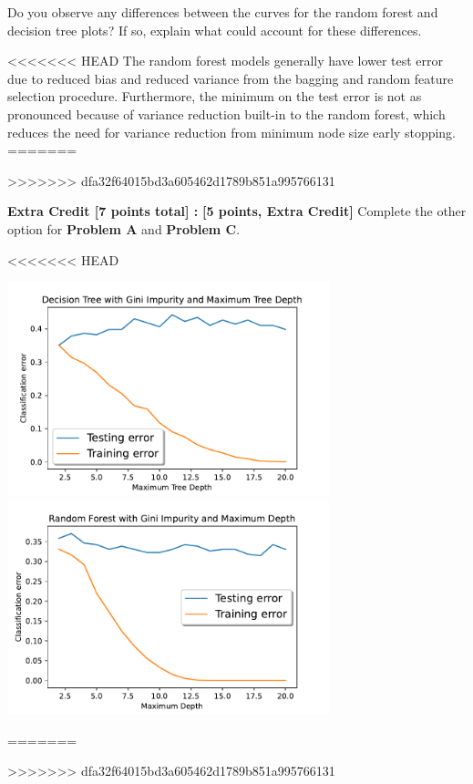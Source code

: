 \problem[4]
Do you observe any differences between the curves for the random forest and decision tree plots? If so, explain what could account for these differences.

\begin{solution}
<<<<<<< HEAD
    The random forest models generally have lower test error due to reduced bias and reduced variance from the bagging and random feature selection procedure. Furthermore, the minimum on the test error is not as pronounced because of variance reduction built-in to the random forest, which reduces the need for variance reduction from minimum node size early stopping.
=======

>>>>>>> dfa32f64015bd3a605462d1789b851a995766131
\end{solution}

\textbf{Extra Credit [7 points total] :} \problem\textbf{[5 points, Extra Credit]} Complete the other option for \textbf{Problem A }and \textbf{Problem C}.

\begin{solution}
<<<<<<< HEAD
    \begin{center}
        \includegraphics[width=0.7\textwidth]{fig2.pdf}
        \includegraphics[width=0.7\textwidth]{fig4.pdf}
    \end{center}
=======
   
>>>>>>> dfa32f64015bd3a605462d1789b851a995766131
\end{solution}

